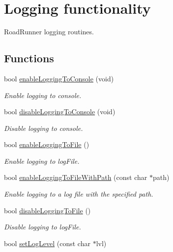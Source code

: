 \hypertarget{group__logging}{\section{Logging functionality}
\label{group__logging}
}


Road\+Runner logging routines.  


\subsection*{Functions}
\begin{DoxyCompactItemize}
\item 
bool \hyperlink{group__logging_ga1289bf0c4cc9c078d53d82b60e8dbdbb}{enable\+Logging\+To\+Console} (void)
\begin{DoxyCompactList}\small\item\em Enable logging to console. \end{DoxyCompactList}\item 
bool \hyperlink{group__logging_ga894d611c74147f5cd1dcb64c1a758b5e}{disable\+Logging\+To\+Console} (void)
\begin{DoxyCompactList}\small\item\em Disable logging to console. \end{DoxyCompactList}\item 
bool \hyperlink{group__logging_ga768513a67f7bb4faceedb0fd377d63eb}{enable\+Logging\+To\+File} ()
\begin{DoxyCompactList}\small\item\em Enable logging to log\+File. \end{DoxyCompactList}\item 
bool \hyperlink{group__logging_gacdb13a47cd0401735d81d0e88e5c13a0}{enable\+Logging\+To\+File\+With\+Path} (const char $\ast$path)
\begin{DoxyCompactList}\small\item\em Enable logging to a log file with the specified path. \end{DoxyCompactList}\item 
bool \hyperlink{group__logging_gac1f91b27feb5ffdb19c6d54f3013d7e0}{disable\+Logging\+To\+File} ()
\begin{DoxyCompactList}\small\item\em Disable logging to log\+File. \end{DoxyCompactList}\item 
bool \hyperlink{group__logging_gad113b4e32a079d7a8c1d188561e1ffbc}{set\+Log\+Level} (const char $\ast$lvl)

\end{DoxyCompactItemize}
